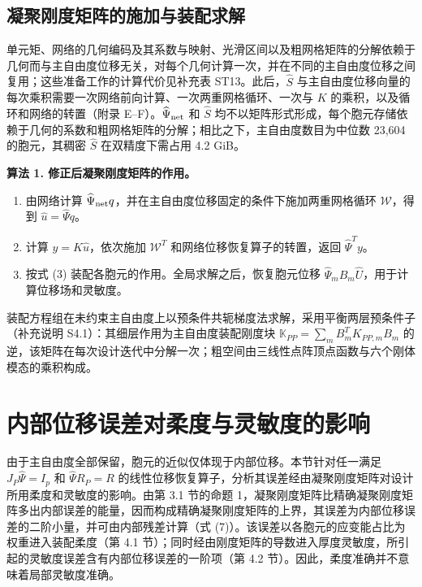 \documentclass[preprint,12pt,authoryear]{elsarticle}
\providecommand{\tightlist}{\setlength{\itemsep}{0pt}\setlength{\parskip}{0pt}}
\begin{document}
\subsection{凝聚刚度矩阵的施加与装配求解}

单元矩、网络的几何编码及其系数与映射、光滑区间以及粗网格矩阵的分解依赖于几何而与主自由度位移无关，对每个几何计算一次，并在不同的主自由度位移之间复用；这些准备工作的计算代价见补充表 ST13。此后，\(\widehat S\) 与主自由度位移向量的每次乘积需要一次网络前向计算、一次两重网格循环、一次与 \(K\) 的乘积，以及循环和网络的转置（附录 E--F）。\(\widehat\Psi_{\rm net}\) 和 \(\widehat S\) 均不以矩阵形式形成，每个胞元存储依赖于几何的系数和粗网格矩阵的分解；相比之下，主自由度数目为中位数 23,604 的胞元，其稠密 \(\widehat S\) 在双精度下需占用 4.2 GiB。

\textbf{算法 1. 修正后凝聚刚度矩阵的作用。}

\begin{enumerate}
\def\labelenumi{\arabic{enumi}.}
\tightlist
\item
  由网络计算 \(\widehat\Psi_{\rm net}q\)，并在主自由度位移固定的条件下施加两重网格循环 \(\mathcal W\)，得到 \(\widehat u=\widehat\Psi q\)。
\item
  计算 \(y=K\widehat u\)，依次施加 \(\mathcal W^T\) 和网络位移恢复算子的转置，返回 \(\widehat\Psi^Ty\)。
\item
  按式 (3) 装配各胞元的作用。全局求解之后，恢复胞元位移 \(\widehat\Psi_mB_m\widehat U\)，用于计算位移场和灵敏度。
\end{enumerate}

装配方程组在未约束主自由度上以预条件共轭梯度法求解，采用平衡两层预条件子（补充说明 S4.1）：其细层作用为主自由度装配刚度块 \(\mathbb K_{PP}=\sum_mB_m^TK_{PP,m}B_m\) 的逆，该矩阵在每次设计迭代中分解一次；粗空间由三线性点阵顶点函数与六个刚体模态的乘积构成。

\section{内部位移误差对柔度与灵敏度的影响}

由于主自由度全部保留，胞元的近似仅体现于内部位移。本节针对任一满足 \(J_P\widehat\Psi=I_p\) 和 \(\widehat\Psi R_P=R\) 的线性位移恢复算子，分析其误差经由凝聚刚度矩阵对设计所用柔度和灵敏度的影响。由第 3.1 节的命题 1，凝聚刚度矩阵比精确凝聚刚度矩阵多出内部误差的能量，因而构成精确凝聚刚度矩阵的上界，其误差为内部位移误差的二阶小量，并可由内部残差计算（式 (7)）。该误差以各胞元的应变能占比为权重进入装配柔度（第 4.1 节）；同时经由刚度矩阵的导数进入厚度灵敏度，所引起的灵敏度误差含有内部位移误差的一阶项（第 4.2 节）。因此，柔度准确并不意味着局部灵敏度准确。
\end{document}
